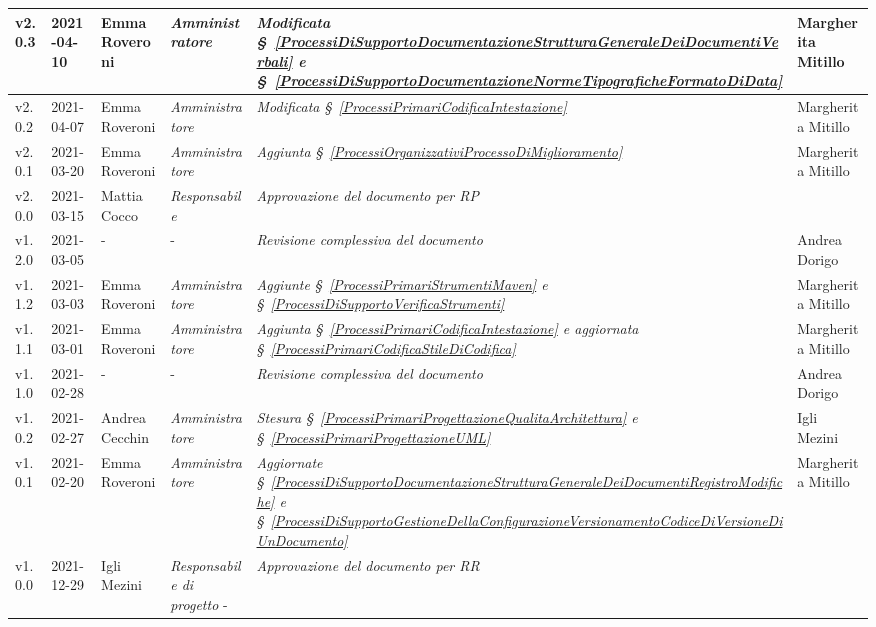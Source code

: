 {\begin{center}
\begin{longtable}[c]{|p{2cm-1\tabcolsep}|p{2cm}|p{3cm-2\tabcolsep}|p{3cm-1.5\tabcolsep}|p{}|p{3cm-2\tabcolsep}|}
		\hline
		\centering v2.0.3 & 2021-04-10 & Emma Roveroni & \centering \textit{Amministratore} & \textit{Modificata \S~\ref{ProcessiDiSupportoDocumentazioneStrutturaGeneraleDeiDocumentiVerbali} e \S~\ref{ProcessiDiSupportoDocumentazioneNormeTipograficheFormatoDiData} } & Margherita Mitillo  \\
		\hline
		\centering v2.0.2 & 2021-04-07 & Emma Roveroni & \centering \textit{Amministratore}  & \textit{Modificata \S~\ref{ProcessiPrimariCodificaIntestazione}} & Margherita Mitillo \\
		\hline
		\centering v2.0.1 & 2021-03-20 & Emma Roveroni & \centering \textit{Amministratore}  & \textit{Aggiunta \S~\ref{ProcessiOrganizzativiProcessoDiMiglioramento} } & Margherita Mitillo \\
		\hline
		\centering v2.0.0 & 2021-03-15 & Mattia Cocco & \centering \textit{Responsabile}  & \textit{Approvazione del documento per RP} & \makecell[c] {-} \\
		\hline
		\centering v1.2.0 & 2021-03-05 & \centering - & \centering - & \textit{Revisione complessiva del documento} & Andrea Dorigo  \\
		\hline
		\centering v1.1.2 & 2021-03-03 & Emma Roveroni & \centering \textit{Amministratore}  & \textit{Aggiunte \S~\ref{ProcessiPrimariStrumentiMaven} e \S~\ref{ProcessiDiSupportoVerificaStrumenti} } & Margherita Mitillo \\
		\hline
		\centering v1.1.1 & 2021-03-01 & Emma Roveroni & \centering \textit{Amministratore} & \textit{Aggiunta  \S~\ref{ProcessiPrimariCodificaIntestazione} e aggiornata  \S~\ref{ProcessiPrimariCodificaStileDiCodifica} } & Margherita Mitillo  \\
		\hline
		\centering v1.1.0 & 2021-02-28 & \centering - & \centering - & \textit{Revisione complessiva del documento}   & Andrea Dorigo \\
		\hline
		\centering v1.0.2 & 2021-02-27 & Andrea Cecchin & \centering \textit{Amministratore}  & \textit{Stesura  \S~\ref{ProcessiPrimariProgettazioneQualitaArchitettura} e \S~\ref{ProcessiPrimariProgettazioneUML}} & Igli Mezini \\
		\hline
		\centering v1.0.1 & 2021-02-20 & Emma Roveroni & \centering \textit{Amministratore}  & \textit{Aggiornate  \S~\ref{ProcessiDiSupportoDocumentazioneStrutturaGeneraleDeiDocumentiRegistroModifiche} e \S~\ref{ProcessiDiSupportoGestioneDellaConfigurazioneVersionamentoCodiceDiVersioneDiUnDocumento}} & Margherita Mitillo \\
		\hline
		\centering v1.0.0 & 2021-12-29 & Igli Mezini & \centering \textit{Responsabile di progetto}  - & \textit{Approvazione del documento per RR} & \makecell[c]{-} \\

\end{longtable}
\end{center}}
